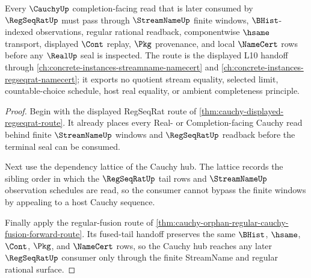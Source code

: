 \begin{theorem}
\label{thm:cauchy-streamname-regseqrat-forward-route}
Every $\CauchyUp$ completion-facing read that is later consumed by $\RegSeqRatUp$ must pass through $\StreamNameUp$ finite windows, $\BHist$-indexed observations, regular rational readback, componentwise $\hsame$ transport, displayed $\Cont$ replay, $\Pkg$ provenance, and local $\NameCert$ rows before any $\RealUp$ seal is inspected. The route is the displayed L10 handoff through \autoref{ch:concrete-instances-streamname-namecert} and \autoref{ch:concrete-instances-regseqrat-namecert}; it exports no quotient stream equality, selected limit, countable-choice schedule, host real equality, or ambient completeness principle.
\end{theorem}
\begin{proof}
Begin with the displayed RegSeqRat route of \autoref{thm:cauchy-displayed-regseqrat-route}. It already places every Real- or Completion-facing Cauchy read behind finite $\StreamNameUp$ windows and $\RegSeqRatUp$ readback before the terminal seal can be consumed.

Next use the dependency lattice of the Cauchy hub. The lattice records the sibling order in which the $\RegSeqRatUp$ tail rows and $\StreamNameUp$ observation schedules are read, so the consumer cannot bypass the finite windows by appealing to a host Cauchy sequence.

Finally apply the regular-fusion route of \autoref{thm:cauchy-orphan-regular-cauchy-fusion-forward-route}. Its fused-tail handoff preserves the same $\BHist$, $\hsame$, $\Cont$, $\Pkg$, and $\NameCert$ rows, so the Cauchy hub reaches any later $\RegSeqRatUp$ consumer only through the finite StreamName and regular rational surface.
\end{proof}
